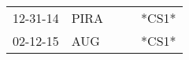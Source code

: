 \begin{supertabular}{p{0.07\textwidth}p{0.06\textwidth}p{0.02\textwidth}p{0.02\textwidth}p{0.06\textwidth}}
 12-31-14\textsuperscript{} &  PIRA\textsuperscript{} &   &   &  *CS1* \\
 02-12-15\textsuperscript{} &   AUG\textsuperscript{} &   &   &  *CS1* \\
\end{supertabular}
